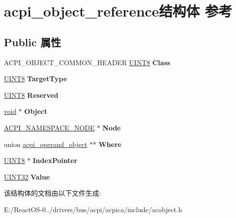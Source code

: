 \hypertarget{structacpi__object__reference}{}\section{acpi\+\_\+object\+\_\+reference结构体 参考}
\label{structacpi__object__reference}
\subsection*{Public 属性}
\begin{DoxyCompactItemize}
\item 
\mbox{\label{structacpi__object__reference_ac859b796cec90f4d25ffb4ef80bc2326}} 
A\+C\+P\+I\+\_\+\+O\+B\+J\+E\+C\+T\+\_\+\+C\+O\+M\+M\+O\+N\+\_\+\+H\+E\+A\+D\+ER \hyperlink{_processor_bind_8h_ab27e9918b538ce9d8ca692479b375b6a}{U\+I\+N\+T8} {\bfseries Class}
\item 
\mbox{\label{structacpi__object__reference_a59ef6568ddbce5cbe8565cfd94b2fc65}} 
\hyperlink{_processor_bind_8h_ab27e9918b538ce9d8ca692479b375b6a}{U\+I\+N\+T8} {\bfseries Target\+Type}
\item 
\mbox{\label{structacpi__object__reference_a340c3694fc2f8dd13851d6bcb0b1de0c}} 
\hyperlink{_processor_bind_8h_ab27e9918b538ce9d8ca692479b375b6a}{U\+I\+N\+T8} {\bfseries Reserved}
\item 
\mbox{\label{structacpi__object__reference_a6eea65c7f8fe6e5ba5b22853e030cfe8}} 
\hyperlink{interfacevoid}{void} $\ast$ {\bfseries Object}
\item 
\mbox{\label{structacpi__object__reference_a3ab49eec0d069650719dff3561bfac3a}} 
\hyperlink{structacpi__namespace__node}{A\+C\+P\+I\+\_\+\+N\+A\+M\+E\+S\+P\+A\+C\+E\+\_\+\+N\+O\+DE} $\ast$ {\bfseries Node}
\item 
\mbox{\label{structacpi__object__reference_a02a01f130345842c4fcd284b4bc97a11}} 
union \hyperlink{unionacpi__operand__object}{acpi\+\_\+operand\+\_\+object} $\ast$$\ast$ {\bfseries Where}
\item 
\mbox{\label{structacpi__object__reference_a8e728aeafd0151cb4d4b189047fbaae8}} 
\hyperlink{_processor_bind_8h_ab27e9918b538ce9d8ca692479b375b6a}{U\+I\+N\+T8} $\ast$ {\bfseries Index\+Pointer}
\item 
\mbox{\label{structacpi__object__reference_a56ee29a909db2a5f85c61b1a7d87ece4}} 
\hyperlink{_processor_bind_8h_ae1e6edbbc26d6fbc71a90190d0266018}{U\+I\+N\+T32} {\bfseries Value}
\end{DoxyCompactItemize}


该结构体的文档由以下文件生成\+:\begin{DoxyCompactItemize}
\item 
E\+:/\+React\+O\+S-\/0../drivers/bus/acpi/acpica/include/acobject.\+h\end{DoxyCompactItemize}
